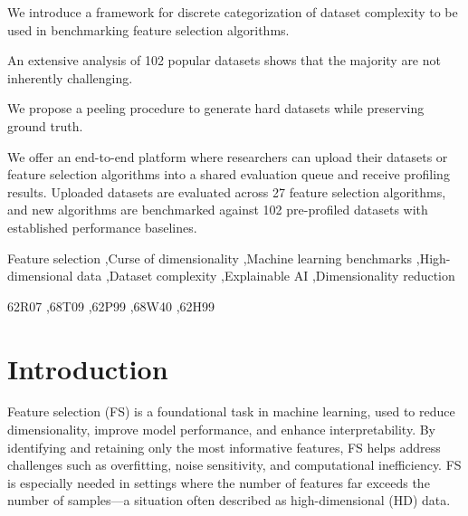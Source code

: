 \documentclass[preprint,12pt,authoryear]{elsarticle}
\begin{document}
\begin{frontmatter}
\begin{highlights}
\item We introduce a framework for discrete categorization of dataset complexity to be used in benchmarking feature selection algorithms.
\item An extensive analysis of 102 popular datasets shows that the majority are not inherently challenging.
\item We propose a peeling procedure to generate hard datasets while preserving ground truth.
\item We offer an end-to-end platform where researchers can upload their datasets or feature selection algorithms into a shared evaluation queue and receive profiling results. Uploaded datasets are evaluated across 27 feature selection algorithms, and new algorithms are benchmarked against 102 pre-profiled datasets with established performance baselines.



\end{highlights}

\begin{keyword}
 Feature selection \sep Curse of dimensionality \sep Machine learning benchmarks \sep High-dimensional data \sep Dataset complexity \sep Explainable AI \sep Dimensionality reduction

\MSC[2020] 62R07 \sep 68T09 \sep 62P99 \sep 68W40 \sep 62H99
\end{keyword}


\end{frontmatter}



\section{Introduction}




\label{chapter:intro}
Feature selection (FS) is a foundational task in machine learning, used to reduce dimensionality, improve model performance, and enhance interpretability. By identifying and retaining only the most informative features, FS helps address challenges such as overfitting, noise sensitivity, and computational inefficiency. FS is especially needed in settings where the number of features far exceeds the number of samples—a situation often described as high-dimensional (HD) data. 
\end{document}
